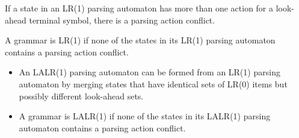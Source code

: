 If a state in an LR(1) parsing automaton has more than one action for a look-ahead 
terminal symbol, there is a parsing action conflict.

A grammar is LR(1) if none of the states in its LR(1) parsing automaton contains a parsing
action conflict.


\begin{itemize}
    \item An LALR(1) parsing automaton can be formed from an LR(1) parsing automaton by 
    merging states that have identical sets of LR(0) items but possibly different look-ahead 
    sets.
    \item A grammar is LALR(1) if none of the states in its LALR(1) parsing automaton contains 
    a parsing action conflict.
\end{itemize}